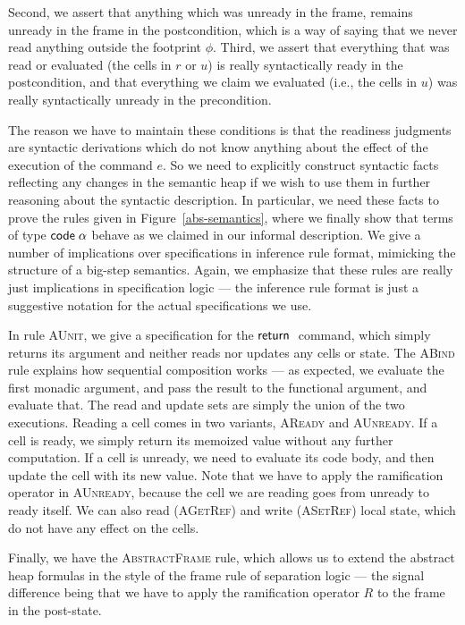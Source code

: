 \documentclass[preprint,natbib]{sigplanconf}
\begin{document}
Second, we assert that anything which was unready in the frame,
remains unready in the frame in the postcondition, which is a way of
saying that we never read anything outside the footprint $\phi$.
Third, we assert that everything that was read or evaluated (the cells
in $r$ or $u$) is really syntactically ready in the postcondition, and
that everything we claim we evaluated (i.e., the cells in $u$) was
really syntactically unready in the precondition.

The reason we have to maintain these conditions is that the readiness
judgments are syntactic derivations which do not know anything about
the effect of the execution of the command $e$. So we need to
explicitly construct syntactic facts reflecting any changes in the
semantic heap if we wish to use them in further reasoning about the
syntactic description. In particular, we need these facts to prove the
rules given in Figure~\ref{abs-semantics}, where we finally show that
terms of type $\mbox{\textsf{{code}}}\;{\alpha}$ behave as we claimed in our informal
description. We give a number of implications over specifications in
inference rule format, mimicking the structure of a big-step
semantics. Again, we emphasize that these rules are really just 
implications in specification logic --- the inference rule format
is just a suggestive notation for the actual specifications we use.

In rule \textsc{AUnit}, we give a specification for the $\mbox{\textsf{{return}}}\;$
command, which simply returns its argument and neither reads nor
updates any cells or state. The \textsc{ABind} rule explains how
sequential composition works --- as expected, we evaluate the first
monadic argument, and pass the result to the functional argument, and
evaluate that. The read and update sets are simply the union of the
two executions. Reading a cell comes in two variants, \textsc{AReady}
and \textsc{AUnready}. If a cell is ready, we simply return its
memoized value without any further computation. If a cell is unready,
we need to evaluate its code body, and then update the cell with its
new value. Note that we have to apply the ramification operator in
\textsc{AUnready}, because the cell we are reading goes from unready to
ready itself. We can also read (\textsc{AGetRef}) and write
(\textsc{ASetRef}) local state, which do not have any effect on the
cells.

Finally, we have the \textsc{AbstractFrame} rule, which allows us to
extend the abstract heap formulas in the style of the frame rule of 
separation logic --- the signal difference being that we have to apply 
the ramification operator $R$ to the frame in the post-state. 
\end{document}
